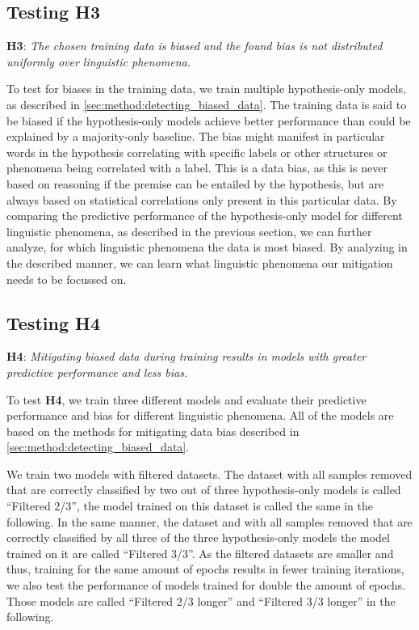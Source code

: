 \subsection{Testing H3}
\textbf{H3}: \textit{The chosen training data is biased and the found bias is not distributed uniformly over linguistic phenomena.}

To test for biases in the training data, we train multiple hypothesis-only models, as described in \autoref{sec:method:detecting_biased_data}. The training data is said to be biased if the hypothesis-only models achieve better performance than could be explained by a majority-only baseline. The bias might manifest in particular words in the hypothesis correlating with specific labels or other structures or phenomena being correlated with a label. This is a data bias, as this is never based on reasoning if the premise can be entailed by the hypothesis, but are always based on statistical correlations only present in this particular data. By comparing the predictive performance of the hypothesis-only model for different linguistic phenomena, as described in the previous section, we can further analyze, for which linguistic phenomena the data is most biased. By analyzing in the described manner, we can learn what linguistic phenomena our mitigation needs to be focussed on.

\subsection{Testing H4}
\textbf{H4}: \textit{Mitigating biased data during training results in models with greater predictive performance and less bias.}

To test \textbf{H4}, we train three different models and evaluate their predictive performance and bias for different linguistic phenomena. All of the models are based on the methods for mitigating data bias described in \autoref{sec:method:detecting_biased_data}. 

We train two models with filtered datasets. The dataset with all samples removed that are correctly classified by two out of three hypothesis-only models is called \enquote{Filtered 2/3}, the model trained on this dataset is called the same in the following. In the same manner, the dataset and with all samples removed that are correctly classified by all three of the three hypothesis-only models the model trained on it are called \enquote{Filtered 3/3}. As the filtered datasets are smaller and thus, training for the same amount of epochs results in fewer training iterations, we also test the performance of models trained for double the amount of epochs. Those models are called \enquote{Filtered 2/3 longer} and \enquote{Filtered 3/3 longer} in the following.


